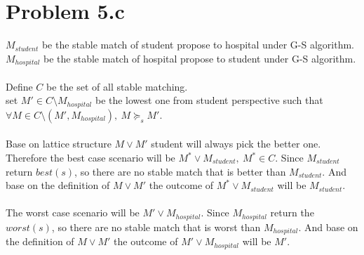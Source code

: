 \documentclass{article}
\begin{document}
\section{Problem 5.c}
$M_{student}$ be the stable match of student propose to hospital under G-S algorithm.\\
$M_{hospital}$ be the stable match of hospital propose to student under G-S algorithm.\\\\
Define $C$ be the set of all stable matching.\\
set $M' \in C\setminus M_{hospital}$ be the lowest one from student perspective such that $\forall M \in C\setminus (M',M_{hospital}),\ M \succeq_s M'$.\\\\
Base on lattice structure $M \lor M'$ student will always pick the better one. \\Therefore the best case scenario will be $M^* \lor M_{student},\ M^* \in C$. Since $M_{student}$ return $best(s)$, so there are no stable match that is better than $M_{student}$. And base on the definition of $M \lor M'$ the outcome of  $M^* \lor M_{student}$ will be $M_{student}$.\\\\
The worst case scenario will be $M' \lor M_{hospital}$. Since $M_{hospital}$ return the $worst(s)$, so there are no stable match that is worst than $M_{hospital}$. And base on the definition of $M \lor M'$ the outcome of  $M' \lor M_{hospital}$ will be $M'$.
\end{document}
